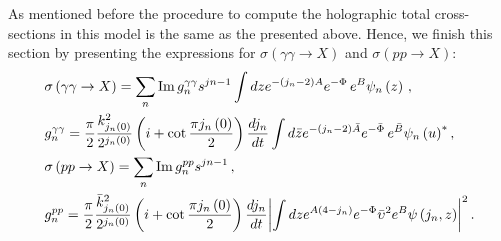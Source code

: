 \documentclass[a4paper,12pt]{article}
\begin{document}
As mentioned before the procedure to compute the holographic total cross-sections in this model is the same as the presented above. Hence, we finish this section by presenting the expressions for $\sigma\left(\gamma \gamma \to X\right)$ and $\sigma\left(p p \to X\right)$:
\begin{align}
&\sigma\left(\gamma \gamma \rightarrow X\right) =  \sum_n {\rm Im} \, g^{\gamma \gamma}_n s^{jn-1} \int dz e^{-\left(j_n - 2 \right)A } e^{-\Phi} \, e^B \psi_n\left(z\right)  \, , \label{eq:sigma_gg_hol_gens}  \\
&g^{\gamma \gamma}_n = \frac{\pi}{2} \frac{k^2_{j_n\left(0\right)}}{2^{j_n\left(0\right)}}  \left(i + \cot \frac{\pi j_n\left(0\right)}{2} \right) \frac{d j_n}{dt}  \int d\bar{z} e^{-\left(j_n - 2 \right)\bar{A} } e^{-\bar{\Phi}}  \, e^{\bar{B}} {\psi_n\left(u\right)}^{*} \, , \label{eq:gg_couplings_def} \\
& \sigma\left( p p \to X \right) = \sum_n {\rm Im} \, g^{p p}_n s^{jn-1}  \, , \label{eq:sigma_pp_hol_gens} \\
&g^{p p}_n = \frac{\pi}{2} \frac{\bar{k}^2_{j_n\left(0\right)}}{2^{j_n\left(0\right)}}  \left(i + \cot \frac{\pi j_n\left(0\right)}{2} \right) \frac{d j_n}{dt} {\left| \int dz  e^{A\left( 4 - j_n \right)} e^{-\Phi}  {\bar{\upsilon}}^2 e^{B}  {\psi\left(j_n, z\right)} \right|}^2  \, \label{eq:pp_couplings_def} .
\end{align}
\end{document}
